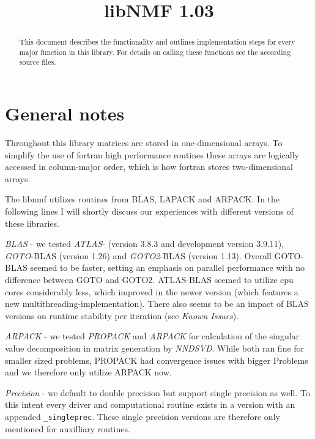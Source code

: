 \documentclass[a4paper,10pt]{scrartcl}
\title{libNMF 1.03}
\begin{document}
\fancyhead{}


\maketitle


	\begin{abstract}
		This document describes the functionality and outlines implementation steps for every major function
		in this	library. For details on calling these functions see the according source files.
	\end{abstract}

\tableofcontents
\pagebreak

	\section{General notes}

	Throughout this library matrices are stored in one-dimensional arrays. To simplify the use of fortran high performance
	routines these arrays are logically accessed in column-major order, which is how fortran stores 
	two-dimensional arrays.\newline

	The libnmf utilizes routines from BLAS, LAPACK and ARPACK. In the following lines
	I will shortly discuss our experiences with different versions of these libraries.

	\emph{BLAS} - we tested \emph{ATLAS}- (version 3.8.3 and development version 3.9.11), \emph{GOTO}-BLAS (version 1.26) and \emph{GOTO2}-BLAS (version 1.13). Overall GOTO-BLAS seemed to be faster,
	setting an emphasis on parallel performance  with no difference between GOTO and GOTO2. ATLAS-BLAS seemed to utilize cpu cores considerably less, which improved in
	the newer version (which features a new multithreading-implementation). There also seems to be an impact of BLAS versions on runtime stability
	per iteration (see \emph{Known Issues}).

	\emph{ARPACK} - we tested \emph{PROPACK} and \emph{ARPACK} for calculation of the singular value decomposition in
	matrix generation by \emph{NNDSVD}. While both ran fine for smaller sized problems, PROPACK had convergence issues
	with bigger Problems and we therefore only utilize ARPACK now.

	\emph{Precision} - we default to double precision but support single precision as well. To this intent every driver and computational routine exists in a version with an appended \texttt{\_singleprec}. These single precision versions are therefore only mentioned for auxilliary routines.
\end{document}
